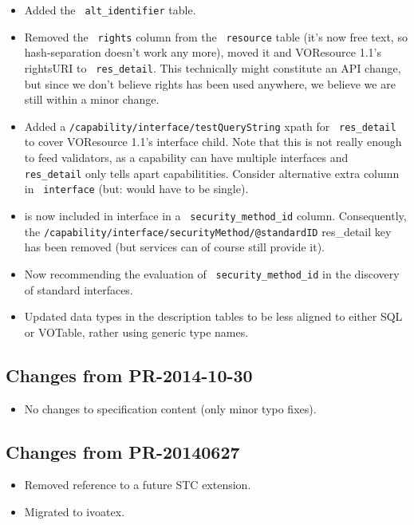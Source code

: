 \documentclass[11pt,a4paper]{ivoa}
\newcommand{\rtent}[1]{\texttt{\color{rtcolor} #1}}
\begin{document}
\begin{itemize}
\item Added the \rtent{alt\_identifier} table.
\item Removed the \rtent{rights} column from the \rtent{resource} table
(it's now free text, so hash-separation doesn't work any more),
moved it and VOResource 1.1's rightsURI to \rtent{res\_detail}.  This
technically might constitute an API change, but since we don't believe
rights has been used anywhere, we believe we are still within a minor
change.
\item Added a \texttt{/capability/interface/testQueryString} xpath for
\rtent{res\_detail} to cover VOResource 1.1's 
interface child.  Note that this is not really enough to feed
validators, as a capability can have multiple interfaces and
\rtent{res\_detail} only tells apart capabilitities.  Consider
alternative extra column in \rtent{interface} (but:
 would have to be single).
\item {} is now included in interface
in a \rtent{security\_method\_id} column.  Consequently, the 
\texttt{/capability/interface/securityMethod/@standardID} res\_detail
key has been removed (but services can of course still provide it).
\item Now recommending the evaluation of \rtent{security\_method\_id} in
the discovery of standard interfaces.
\item Updated data types in the description tables to be less aligned to
either SQL or VOTable, rather using generic type names.
\end{itemize}

\subsection{Changes from PR-2014-10-30}

\begin{itemize}
\item No changes to specification content (only minor typo fixes).
\end{itemize}


\subsection{Changes from PR-20140627}

\begin{itemize}
\item Removed reference to a future STC extension.
\item Migrated to ivoatex.
\end{itemize}
\end{document}
